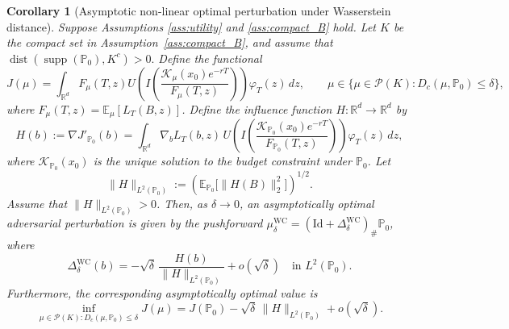 \documentclass[11pt]{article}
\newtheorem{corollary}{Corollary}
\theoremstyle{definition}
\newcommand{\R}{\mathbb{R}}
\newcommand{\E}{\mathbb{E}}
\begin{document}
\begin{corollary}[Asymptotic non-linear optimal perturbation under Wasserstein distance]
\label{thm:asymptotic_perturbation_cor}
Suppose Assumptions \ref{ass:utility} and \ref{ass:compact_B} hold.
Let $K$ be the compact set in Assumption~\ref{ass:compact_B}, and assume that $\operatorname{dist}\!\left(
\operatorname{supp}(\mathbb{P}_0),K^c
\right)>0.$ 
Define the functional
\[
J(\mu)
=
\int_{\mathbb R^d}
F_\mu(T,z)
U\!\left(
I\!\left(
\frac{\mathcal K_\mu(x_0)e^{-rT}}{F_\mu(T,z)}
\right)
\right)
\varphi_T(z)\,dz,  \qquad \mu \in \{{\mu \in \mathcal{P}(K)}: D_c(\mu,\mathbb{P}_0) \le \delta\},
\]
where $F_\mu(T,z)= \mathbb E_\mu[L_T(B,z)]$. 
Define the influence function $H: \R^d \to \R^d$ by
\[
H(b)
:= \nabla J'_{\mathbb{P}_0}(b)
= \int_{\R^{d}} \nabla_b L_T(b,z)\,
U\!\left(
I\!\left(
\frac{\mathcal{K}_{\mathbb{P}_0}(x_0)e^{-rT}}
{F_{\mathbb{P}_0}(T,z)}
\right)
\right)
\varphi_T(z)\,dz,
\]
where $\mathcal{K}_{\mathbb{P}_0}(x_0)$ is the unique solution to the budget constraint under $\mathbb{P}_0$. Let 
\[
\|H\|_{L^2(\mathbb{P}_0)} 
:= \left( \E_{\mathbb{P}_0}\big[\|H(B)\|_2^2\big] \right)^{1/2}.
\]
Assume that $\|H\|_{L^2(\mathbb{P}_0)}>0$.
Then, as $\delta \to 0$, an asymptotically optimal adversarial perturbation is given by the pushforward $\mu^{\text{WC}}_\delta = (\text{Id} + \Delta^{\text{WC}}_\delta)_{\#}\mathbb{P}_0$, where
\[
\Delta_\delta^{\text{WC}}(b)
=
-\sqrt{\delta}\,
\frac{H(b)}{\|H\|_{L^2(\mathbb{P}_0)}}
+ o(\sqrt{\delta})
\quad\text{in }L^2(\mathbb{P}_0).
\]
Furthermore, the corresponding asymptotically optimal value is
\[
\inf_{{\mu \in \mathcal{P}(K)}: D_c(\mu,\mathbb{P}_0) \le \delta} J(\mu)
= J(\mathbb{P}_0) - \sqrt{\delta}\, \|H\|_{L^2(\mathbb{P}_0)} + o(\sqrt{\delta}).
\]
\end{corollary}
\end{document}
